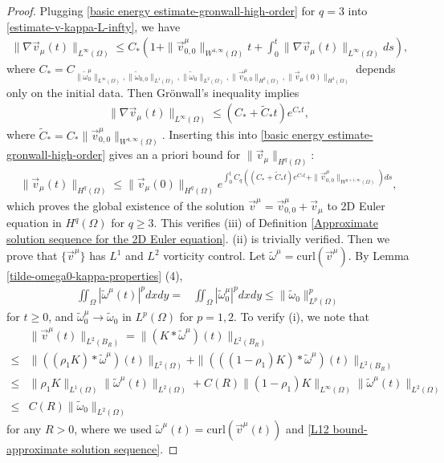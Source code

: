 \documentclass[1 [leqno, 11pt]{amsart}
\numberwithin{equation}{section}
\begin{document}
\begin{CJK*}{GBK}{song}
\begin{appendix}
\begin{proof}
Plugging \eqref{basic energy estimate-gronwall-high-order} for $q=3$ into \eqref{estimate-v-kappa-L-infty}, we have
\begin{align*}
\|\nabla\vec{v}_{\mu}(t)\|_{L^\infty(\Omega)}\leq C_*\left(1+\|\vec{v}_{0,0}^{\mu}\|_{W^{4,\infty}(\Omega)}t+
\int_0^t\|\nabla \vec{v}_{\mu}(t)\|_{L^\infty(\Omega)}ds\right),
\end{align*}
where $C_*=C_{\|\tilde\omega_{0}^\mu\|_{L^\infty(\Omega)},\|\tilde\omega_{0,0}\|_{L^1(\Omega)},\|\tilde\omega_0\|_{L^2(\Omega)},
\|\vec{v}_{0,0}^{\mu}\|_{H^3(\Omega)},\|\vec{v}_{\mu}(0)\|_{H^3(\Omega)}}$
depends only on the initial data.
Then Gr\"{o}nwall's inequality implies
\begin{align*}
\|\nabla\vec{v}_{\mu}(t)\|_{L^\infty(\Omega)}\leq (C_*+\tilde C_* t)e^{C_*t},
\end{align*}
where $\tilde C_*=C_*\|\vec{v}_{0,0}^{\mu}\|_{W^{4,\infty}(\Omega)}$.
Inserting this into \eqref{basic energy estimate-gronwall-high-order}  gives an a priori bound for $\|\vec{v}_{\mu}\|_{H^q(\Omega)}$:
\begin{align}\label{BKM}
\|\vec{v}_{\mu}(t)\|_{H^q(\Omega)}\leq \|\vec{v}_{\mu}(0)\|_{H^q(\Omega)}e^{\int_0^tC_q\left( (C_*+\tilde C_* t)e^{C_*t}+\|\vec{v}_{0,0}^{\mu}\|_{W^{q+1,\infty}(\Omega)}\right)ds},
 \end{align}
 which proves the global existence  of the  solution $\vec{v}^{\mu}=\vec{v}_{0,0}^{\mu}+\vec{v}_{\mu}$ to 2D Euler equation in $H^q(\Omega)$ for $q\geq3$. This verifies (iii) of Definition \ref{Approximate solution sequence for the 2D Euler equation}. (ii) is trivially  verified. Then we prove that $\{\vec{v}^\mu\}$ has  $L^1$ and $L^2$ vorticity control.
  Let $\tilde \omega^\mu=\text{curl}(\vec{v}^\mu)$.
By Lemma \ref{tilde-omega0-kappa-properties} (4),
\begin{align}\label{L12 bound-approximate solution sequence}
\iint_{\Omega}|\tilde\omega^\mu(t)|^pdxdy=&\iint_{\Omega}|\tilde\omega_0^\mu|^pdxdy\leq \|\tilde\omega_{0}\|_{L^p(\Omega)}^p
\end{align}
for $t\geq0$, and
 $\tilde \omega_0^{\mu}\to\tilde\omega_0$ in $L^p(\Omega)$ for $p=1,2$. To  verify (i), we
 note that
 \begin{align}\nonumber
 &\|\vec{v}^\mu(t)\|_{L^2(B_R)}=\|(K*\tilde \omega^\mu)(t)\|_{L^2(B_R)}\\\nonumber
 \leq& \|((\rho_1K)*\tilde \omega^\mu)(t)\|_{L^2(\Omega)}+\|(((1-\rho_1)K)*\tilde \omega^\mu)(t)\|_{L^2(B_R)}\\\nonumber
 \leq&\|\rho_1K\|_{L^1(\Omega)}\|\tilde \omega^\mu(t)\|_{L^2(\Omega)}+C(R)\|(1-\rho_1)K\|_{L^\infty(\Omega)}\|\tilde \omega^\mu(t)\|_{L^2(\Omega)}\\\label{uniform L2 bound v kappa}
 \leq&C(R)\|\tilde \omega_0\|_{L^2(\Omega)}
 \end{align}
 for any $ R>0$,
where we used $\tilde \omega^\mu(t)=\text{curl}(\vec{v}^\mu(t))$ and \eqref{L12 bound-approximate solution sequence}.


\end{proof}
\end{appendix}
\end{CJK*}
\end{document}
